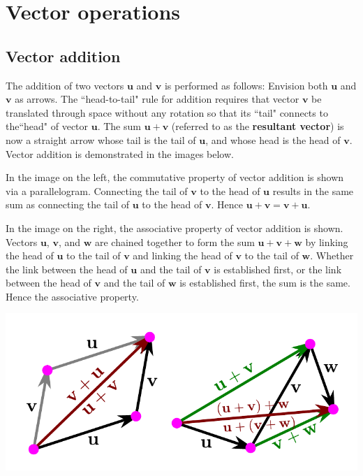 \documentclass{article}
\begin{document}
\section*{Vector operations}

\subsection*{Vector addition}

The addition of two vectors \(\mathbf{u}\) and \(\mathbf{v}\) is performed as follows: Envision both \(\mathbf{u}\) and \(\mathbf{v}\) as arrows. The ``head-to-tail" rule for addition requires that vector \(\mathbf{v}\) be translated through space without any rotation so that its ``tail" connects to the``head" of vector \(\mathbf{u}\). The sum \(\mathbf{u} + \mathbf{v}\) (referred to as the {\bf resultant vector}) is now a straight arrow whose tail is the tail of \(\mathbf{u}\), and whose head is the head of \(\mathbf{v}\). Vector addition is demonstrated in the images below. 

In the image on the left, the commutative property of vector addition is shown via a parallelogram. Connecting the tail of \(\mathbf{v}\) to the head of \(\mathbf{u}\) results in the same sum as connecting the tail of \(\mathbf{u}\) to the head of \(\mathbf{v}\). Hence \(\mathbf{u} + \mathbf{v} = \mathbf{v} + \mathbf{u}\). 

In the image on the right, the associative property of vector addition is shown. Vectors \(\mathbf{u}\), \(\mathbf{v}\), and \(\mathbf{w}\) are chained together to form the sum \(\mathbf{u} + \mathbf{v} + \mathbf{w}\) by linking the head of \(\mathbf{u}\) to the tail of \(\mathbf{v}\) and linking the head of \(\mathbf{v}\) to the tail of \(\mathbf{w}\). Whether the link between the head of \(\mathbf{u}\) and the tail of \(\mathbf{v}\) is established first, or the link between the head of \(\mathbf{v}\) and the tail of \(\mathbf{w}\) is established first, the sum is the same. Hence the associative property.

\includegraphics[width = \textwidth]{vector_addition}
\end{document}
